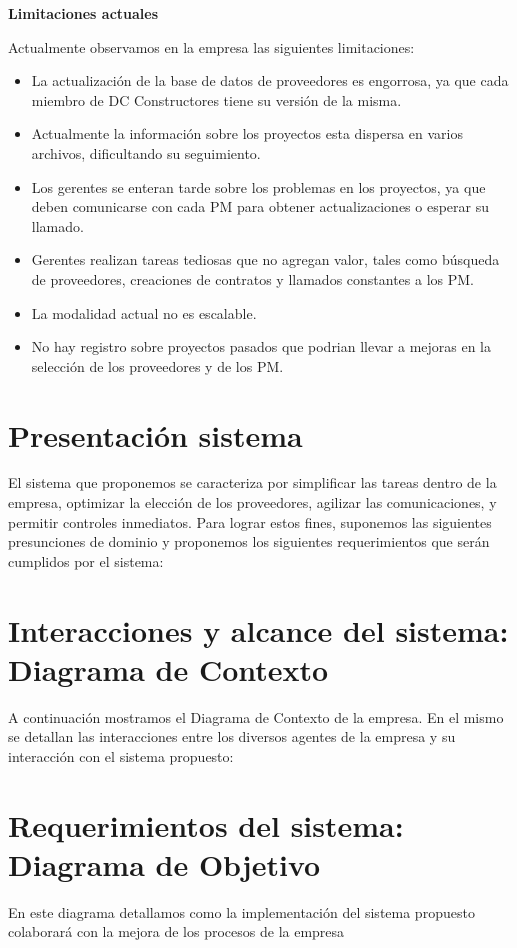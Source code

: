 \textbf{Limitaciones actuales}

Actualmente observamos en la empresa las siguientes limitaciones:
\begin{itemize}
    \item La actualización de la base de datos de proveedores es engorrosa, ya que cada miembro de DC Constructores tiene su versión de la misma.
    \item Actualmente la información sobre los proyectos esta dispersa en varios archivos, dificultando su seguimiento.
    \item Los gerentes se enteran tarde sobre los problemas en los proyectos, ya que deben comunicarse con cada PM para obtener actualizaciones o esperar su llamado.
    \item Gerentes realizan tareas tediosas que no agregan valor, tales como búsqueda de proveedores, creaciones de contratos y llamados constantes a los PM.
    \item La modalidad actual no es escalable.
    \item No hay registro sobre proyectos pasados que podrian llevar a mejoras en la selección de los proveedores y de los PM.
\end{itemize}

\section{Presentación sistema}
El sistema que proponemos se caracteriza por simplificar las tareas dentro de la empresa, optimizar la elección de los proveedores, agilizar las comunicaciones, y permitir controles inmediatos. Para lograr estos fines, suponemos las siguientes presunciones de dominio y proponemos los siguientes requerimientos que serán cumplidos por el sistema:

\section{Interacciones y alcance del sistema: Diagrama de Contexto}
A continuación mostramos el Diagrama de Contexto de la empresa. En el mismo se detallan las interacciones entre los diversos agentes de la empresa y su interacción con el sistema propuesto:

\section{Requerimientos del sistema: Diagrama de Objetivo}
En este diagrama detallamos como la implementación del sistema propuesto colaborará con la mejora de los procesos de la empresa


